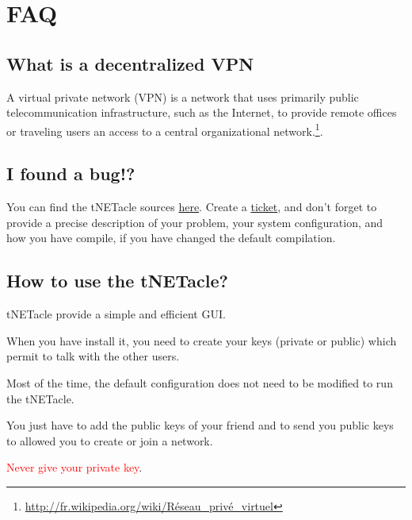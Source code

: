 \section{FAQ}
\subsection{What is a decentralized VPN}
A virtual private network (VPN) is a network that uses primarily public telecommunication infrastructure, such as the Internet, to provide remote offices or traveling users an access to a central organizational network.\footnote{\url{http://fr.wikipedia.org/wiki/Réseau\_privé\_virtuel}}.

\subsection{I found a bug!?}

You can find the tNETacle sources \href{https://github.com/LaKabane/tNETacle}{here}.
Create a \href{https://github.com/LaKabane/tNETacle/issues/new}{ticket}, and don't forget to provide a precise description of your problem, your system configuration, and how you have compile, if you have changed the default compilation.

\subsection{How to use the tNETacle?}
tNETacle provide a simple and efficient GUI.

When you have install it, you need to create your keys (private or public) which permit to talk with the other users.

Most of the time, the default configuration does not need to be modified to run the tNETacle.

You just have to add the public keys of your friend and to send you public keys to allowed you to create or join a network.

\textcolor{red}{Never give your private key}.

